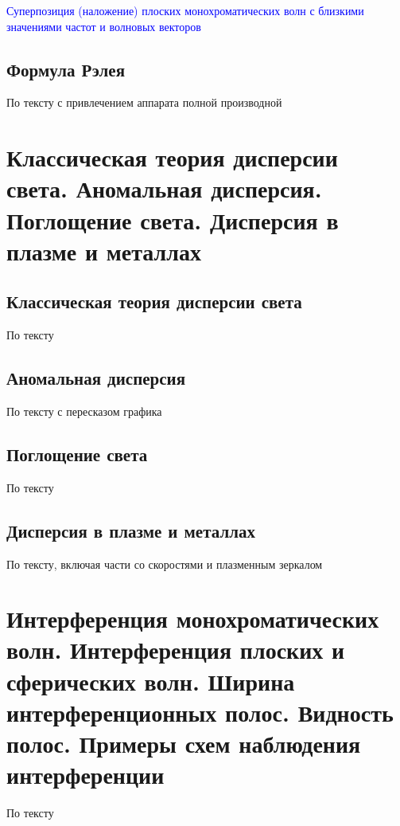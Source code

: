 \documentclass[a4paper, 14pt]{article}
\begin{document}
    \textcolor{blue}{Суперпозиция (наложение) плоских монохроматических волн с близкими значениями частот и волновых
    векторов}
    
    \subsection{Формула Рэлея}
    
    По тексту с привлечением аппарата полной производной
    
    \section{Классическая теория дисперсии света.
    Аномальная дисперсия.
    Поглощение света.
    Дисперсия в плазме и металлах}
    
    \subsection{Классическая теория дисперсии света}
    
    По тексту
    
    \subsection{Аномальная дисперсия}
    
    По тексту с пересказом графика
    
    \subsection{Поглощение света}
    
    По тексту
    
    \subsection{Дисперсия в плазме и металлах}
    
    По тексту, включая части со скоростями и плазменным зеркалом
    
    \section{Интерференция монохроматических волн.
    Интерференция плоских и сферических волн.
    Ширина интерференционных полос.
    Видность полос.
    Примеры схем наблюдения интерференции}
    
    По тексту
    
\end{document}
